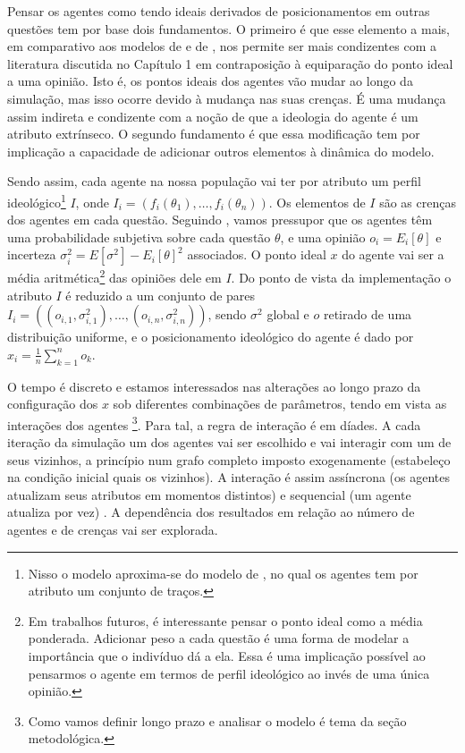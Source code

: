 Pensar os agentes como tendo ideais derivados de posicionamentos em outras
questões tem por base dois fundamentos. O primeiro é que esse elemento a mais, em
comparativo aos modelos de  e de
, nos permite ser mais condizentes com a
literatura discutida no Capítulo 1 em contraposição à equiparação do ponto ideal
a uma opinião. Isto é, os pontos ideais dos agentes vão mudar ao longo da
simulação, mas isso ocorre devido à mudança nas suas crenças. É uma
mudança assim indireta e condizente com a noção de que a ideologia do agente é
um atributo extrínseco. O segundo fundamento é que essa modificação tem por
implicação a capacidade de adicionar outros elementos à dinâmica do modelo.

Sendo assim, cada agente na nossa população vai ter por atributo um perfil
ideológico\footnote{Nisso o modelo aproxima-se do modelo de
  , no qual os agentes tem por atributo um
  conjunto de traços.} \(I\), onde \(I_i = (f_i(\theta_1), \ldots, f_i(\theta_n)) \). Os
elementos de \(I\) são as crenças dos agentes em cada questão. Seguindo
, vamos pressupor que os agentes têm uma
probabilidade subjetiva sobre cada questão \(\theta\), e uma opinião \( o_i =
E_i[\theta]\) e incerteza \( \sigma_i^2 = E[\sigma^2] - E_ i[\theta]^2\) associados. O ponto ideal
\(x\) do agente vai ser a média aritmética\footnote{Em trabalhos futuros, é
  interessante pensar o ponto ideal como a média ponderada. Adicionar peso a
  cada questão é uma forma de modelar a importância que o indivíduo dá a ela.
  Essa é uma implicação possível ao pensarmos o agente em termos de perfil
  ideológico ao invés de uma única opinião.} das opiniões dele em \(I\). Do
ponto de vista da implementação o atributo \(I\) é reduzido a um conjunto de
pares \(I_i = ((o_{i,1},\sigma_{i,1}^2), \ldots, (o_{i,n}, \sigma_{i,n}^2) )\), sendo \(\sigma^2\)
global e \(o\) retirado de uma distribuição uniforme, e o posicionamento
ideológico do agente é dado por \(x_i = \frac{1}{n}\sum_{k=1}^{n} o_k\).


O tempo é discreto e estamos interessados nas alterações ao longo prazo da
configuração dos \(x\) sob diferentes combinações de parâmetros, tendo em vista
as interações dos agentes \cite{acemoglu2011opinion} \footnote{Como vamos
  definir longo prazo e analisar o modelo é tema da seção metodológica.}. Para
tal, a regra de interação é em díades. A cada iteração da simulação um dos
agentes vai ser escolhido e vai interagir com um de seus vizinhos, a princípio
num grafo completo imposto exogenamente (estabeleço na condição
  inicial quais os vizinhos). A interação é assim assíncrona (os agentes
atualizam seus atributos em momentos distintos) e sequencial (um agente atualiza
por vez) \cite{wilensky2015introduction}. A dependência dos resultados em
relação ao número de agentes e de crenças vai ser explorada.


